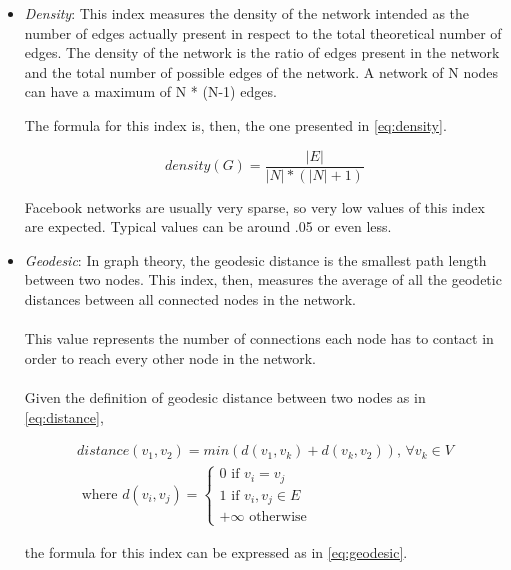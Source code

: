 \begin{itemize}

\item \emph{Density}: This index measures the density of the network intended as the number of edges actually present in respect to the total theoretical number of edges.
The density of the network is the ratio of edges present in the network and the total number of possible edges of the network.
A network of N nodes can have a maximum of N * (N-1) edges.

The formula for this index is, then, the one presented in \ref{eq:density}.

\begin{equation}
density(G) = 
\frac{\left | E \right |}
{\left | N \right | * \left ( \left | N \right | + 1 \right )}
\label{eq:density}
\end{equation}

Facebook networks are usually very sparse, so very low values of this index are expected.
Typical values can be around .05 or even less.

\item \emph{Geodesic}: In graph theory, the geodesic distance is the smallest path length between two nodes.
This index, then, measures the average of all the geodetic distances between all connected nodes in the network.\\
\\
This value represents the number of connections each node has to contact in order to reach every other node in the network.\\
\\
Given the deﬁnition of geodesic distance between two nodes as in \ref{eq:distance},

\begin{equation}
\begin{split}
distance(v_{1}, v_{2}) = min\left ( d(v_{1}, v_{k}) + d(v_{k}, v_{2}) \right )
\textrm{, } \forall v_{k} \in V \\
\textrm{ where }
d(v_{i}, v_{j})=\left \{
\begin{matrix}
0 \textrm{ if } v_{i} = v_{j} \\
1 \textrm{ if } v_{i}, v_{j} \in E \\
+\infty \textrm{ otherwise}
\end{matrix}
\right.
\end{split}
\label{eq:distance}
\end{equation}

the formula for this index can be expressed as in \ref{eq:geodesic}.


\end{itemize}
